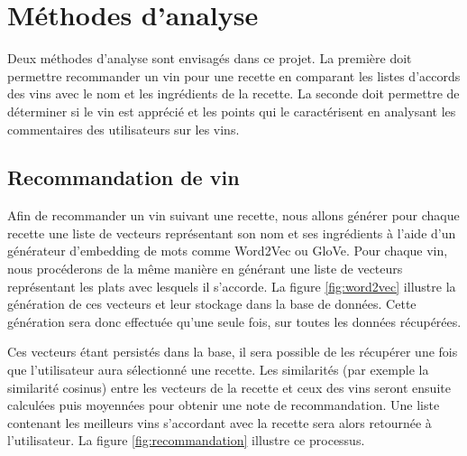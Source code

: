 \section{Méthodes d'analyse}

Deux méthodes d'analyse sont envisagés dans ce projet. La première doit permettre recommander un vin pour une recette en comparant les listes d'accords des vins avec le nom et les ingrédients de la recette. La seconde doit permettre de déterminer si le vin est apprécié et les points qui le caractérisent en analysant les commentaires des utilisateurs sur les vins.

\subsection{Recommandation de vin}

Afin de recommander un vin suivant une recette, nous allons générer pour chaque recette une liste de vecteurs représentant son nom et ses ingrédients à l'aide d'un générateur d'embedding de mots comme Word2Vec ou GloVe. Pour chaque vin, nous procéderons de la même manière en générant une liste de vecteurs représentant les plats avec lesquels il s'accorde. La figure \ref{fig:word2vec} illustre la génération de ces vecteurs et leur stockage dans la base de données. Cette génération sera donc effectuée qu'une seule fois, sur toutes les données récupérées.

Ces vecteurs étant persistés dans la base, il sera possible de les récupérer une fois que l'utilisateur aura sélectionné une recette. Les similarités (par exemple la similarité cosinus) entre les vecteurs de la recette et ceux des vins seront ensuite calculées puis moyennées pour obtenir une note de recommandation. Une liste contenant les meilleurs vins s'accordant avec la recette sera alors retournée à l'utilisateur. La figure \ref{fig:recommandation} illustre ce processus.


